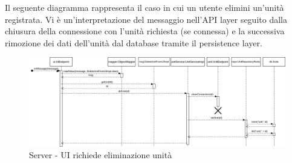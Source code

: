 		\newpage

		\begin{landscape}
			Il seguente diagramma rappresenta il caso in cui un utente elimini un'unità registrata. Vi è un'interpretazione del messaggio nell'API layer seguito dalla chiusura della connessione con l'unità richiesta (se connessa) e la successiva rimozione dei dati dell'unità dal database tramite il persistence layer.
			\begin{figure}[H]
				\centering
				\includegraphics[width=25.7cm]{img/server_seq3.png}
				\caption{Server - UI richiede eliminazione unità}
			\end{figure}
		\end{landscape}

